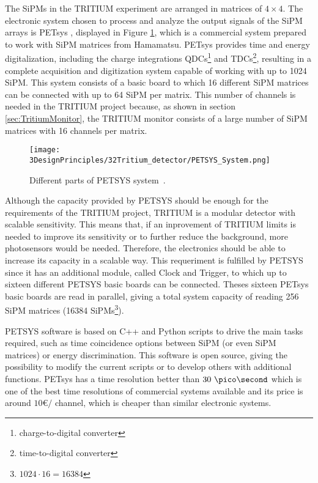 The SiPMs in the TRITIUM experiment are arranged in matrices of $4\times 4$. The electronic system chosen to process and analyze the output signals of the SiPM arrays is PETsys \cite{PETSYS}, displayed in Figure \ref{fig:PETSYS}, which is a commercial system prepared to work with SiPM matrices from Hamamatsu. PETsys provides time and energy digitalization, including the charge integrations QDCs\footnote{charge-to-digital converter} and TDCs\footnote{time-to-digital converter}, resulting in a complete acquisition and digitization system capable of working with up to 1024 SiPM. This system consists of a basic board to which 16 different SiPM matrices can be connected with up to 64 SiPM per matrix. This number of channels is needed in the TRITIUM project because, as shown in section \ref{sec:TritiumMonitor}, the TRITIUM monitor consists of a large number of SiPM matrices with 16 channels per matrix.

\begin{figure}[h]
\centering
\texttt{[image: 3DesignPrinciples/32Tritium\_detector/PETSYS\_System.png]}
\caption{Different parts of PETSYS system\label{fig:PETSYS}~\cite{PETSYS}.}
\end{figure}
Although the capacity provided by PETSYS should be enough for the requirements of the TRITIUM project, TRITIUM is a modular detector with scalable sensitivity. This means that, if an inprovement of TRITIUM limits is needed to improve its sensitivity or to further reduce the background, more photosensors would be needed. Therefore, the electronics should be able to increase its capacity in a scalable way. This requeriment is fulfilled by PETSYS since it has an additional module, called Clock and Trigger, to which up to sixteen different PETSYS basic boards can be connected. Theses sixteen PETsys basic boards are read in parallel, giving a total system capacity of reading 256 SiPM matrices (16384 SiPMs\footnote{$1024\cdot{}16 = 16384$}). 

PETSYS software is based on C++ and Python scripts to drive the main tasks required, such as time coincidence options between SiPM (or even SiPM matrices) or energy discrimination. This software is open source, giving the possibility to modify the current scripts or to develop others with additional functions. PETsys has a time resolution better than $30~\pico\second$ which is one of the best time resolutions of commercial systems available and its price is around $10$\euro$/$ channel, which is cheaper than similar electronic systems.

